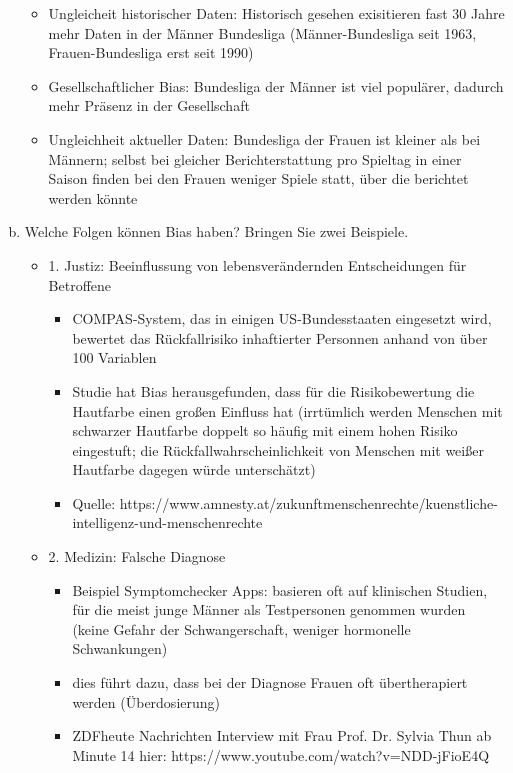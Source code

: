 \documentclass[12pt,ngerman]{AssignmentClass}
\begin{document}
\begin{enumerate}[a)]
                \begin{itemize}
                    \item Ungleicheit historischer Daten: Historisch gesehen exisitieren fast 30 Jahre mehr Daten in der Männer Bundesliga (Männer-Bundesliga seit 1963, Frauen-Bundesliga erst seit 1990)
                    \item Gesellschaftlicher Bias: Bundesliga der Männer ist viel populärer, dadurch mehr Präsenz in der Gesellschaft
                    \item Ungleichheit aktueller Daten: Bundesliga der Frauen ist kleiner als bei Männern; selbst bei gleicher Berichterstattung pro Spieltag in einer Saison finden bei den Frauen weniger Spiele statt, über die berichtet werden könnte
                \end{itemize}
    
            \item Welche Folgen können Bias haben? Bringen Sie zwei Beispiele.
            \begin{itemize}
                \item 1. Justiz: Beeinflussung von lebensverändernden Entscheidungen für Betroffene
                \begin{itemize}
                    \item COMPAS-System, das in einigen US-Bundesstaaten eingesetzt wird, bewertet das Rückfallrisiko inhaftierter Personnen anhand von über 100 Variablen
                    \item Studie hat Bias herausgefunden, dass für die Risikobewertung die Hautfarbe einen großen Einfluss hat (irrtümlich werden Menschen mit schwarzer Hautfarbe doppelt so häufig mit einem hohen Risiko eingestuft; die Rückfallwahrscheinlichkeit von Menschen mit weißer Hautfarbe dagegen würde unterschätzt)
                    \item Quelle: https://www.amnesty.at/zukunftmenschenrechte/kuenstliche-intelligenz-und-menschenrechte
                \end{itemize}
                \item 2. Medizin: Falsche Diagnose
                \begin{itemize}
                    \item Beispiel Symptomchecker Apps: basieren oft auf klinischen Studien, für die meist junge Männer als Testpersonen genommen wurden (keine Gefahr der Schwangerschaft, weniger hormonelle Schwankungen)
                    \item dies führt dazu, dass bei der Diagnose Frauen oft übertherapiert werden (Überdosierung)
                    \item ZDFheute Nachrichten Interview mit Frau Prof. Dr. Sylvia Thun ab Minute 14 hier:
                    https://www.youtube.com/watch?v=NDD-jFioE4Q
                \end{itemize}
            \end{itemize}
            

\end{enumerate}
\end{document}
